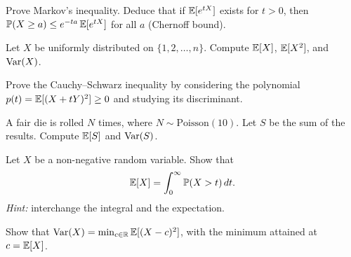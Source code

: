 \begin{exercise}
Prove Markov's inequality. Deduce that if $\mathbb{E}[e^{tX}]$ exists for $t > 0$, then
$\mathbb{P}(X \geq a) \leq e^{-ta}\,\mathbb{E}[e^{tX}]$ for all $a$ (Chernoff bound).
\end{exercise}

\begin{exercise}
Let $X$ be uniformly distributed on $\{1, 2, \ldots, n\}$. Compute $\mathbb{E}[X]$,
$\mathbb{E}[X^2]$, and $\mathrm{Var}(X)$.
\end{exercise}

\begin{exercise}
Prove the Cauchy--Schwarz inequality by considering the polynomial
$p(t) = \mathbb{E}[(X + tY)^2] \geq 0$ and studying its discriminant.
\end{exercise}

\begin{exercise}
A fair die is rolled $N$ times, where $N \sim \mathrm{Poisson}(10)$.
Let $S$ be the sum of the results. Compute $\mathbb{E}[S]$ and $\mathrm{Var}(S)$.
\end{exercise}

\begin{exercise}
Let $X$ be a non-negative random variable. Show that
\[
    \mathbb{E}[X] = \int_0^{\infty} \mathbb{P}(X > t)\,dt.
\]
\textit{Hint:} interchange the integral and the expectation.
\end{exercise}

\begin{exercise}
Show that $\mathrm{Var}(X) = \min_{c \in \mathbb{R}}\mathbb{E}[(X-c)^2]$, with the minimum attained
at $c = \mathbb{E}[X]$.
\end{exercise}
